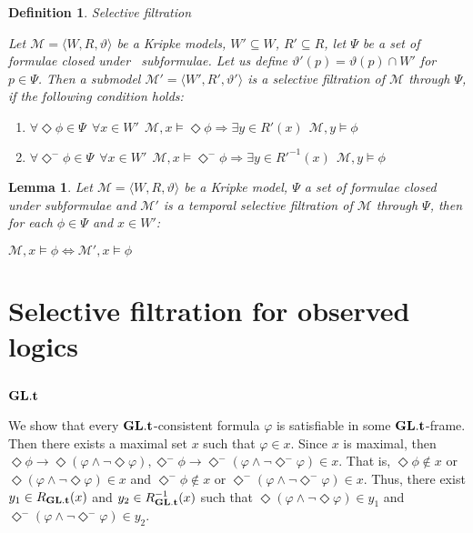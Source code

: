 \documentclass[a4paper]{article}
\theoremstyle{defin}
\newtheorem{defin}{Definition}
\theoremstyle{theorem}
\theoremstyle{prop}
\theoremstyle{lemma}
\newtheorem{lemma}{Lemma}
\theoremstyle{ex}
\theoremstyle{col}
\newcommand{\DiamondM}{\Diamond^{-}}
\begin{document}
\begin{defin} Selective filtration

  Let $\mathcal{M} = \langle W, R, \vartheta \rangle$ be a Kripke models, $W' \subseteq W$, $R' \subseteq R$, let $\Psi$ be a set of formulae closed under \
  subformulae. Let us define $\vartheta'(p) = \vartheta(p) \cap W'$ for $p \in \Psi$. Then a submodel $\mathcal{M}' = \langle W', R', \vartheta' \rangle$ is a
  selective filtration of $\mathcal{M}$ through $\Psi$, if the following condition holds:

  \begin{enumerate}
    \item $\forall \Diamond \phi \in \Psi \:\: \forall x \in W' \:\: \mathcal{M}, x \models \Diamond \phi \Rightarrow \exists y \in R'(x) \:\: \mathcal{M}, y \models \phi$
    \item $\forall \DiamondM \phi \in \Psi \:\: \forall x \in W' \:\: \mathcal{M}, x \models \DiamondM \phi \Rightarrow \exists y \in R'^{-1}(x) \:\: \mathcal{M}, y \models \phi$
  \end{enumerate}
\end{defin}

\begin{lemma}
  Let $\mathcal{M} = \langle W, R, \vartheta \rangle$ be a Kripke model, $\Psi$ a set of formulae closed under subformulae and $\mathcal{M}'$ is a temporal selective filtration of $\mathcal{M}$ through $\Psi$, then for each $\phi \in \Psi$ and $x \in W'$:

  \begin{center}
    $\mathcal{M}, x \models \phi \Leftrightarrow \mathcal{M}', x \models \phi$
  \end{center}
\end{lemma}

\section{Selective filtration for observed logics}

\subsection{${\bf GL}.{\bf t}$}

We show that every ${\bf GL}.{\bf t}$-consistent formula $\varphi$ is satisfiable in some ${\bf GL}.{\bf t}$-frame. Then there exists a maximal set $x$ such that $\varphi \in x$.
Since $x$ is maximal, then $\Diamond \phi \to \Diamond (\varphi \land \neg \Diamond \varphi), \DiamondM \phi \to \DiamondM (\varphi \land \neg \DiamondM \varphi) \in x$. That is, $\Diamond \phi \notin x$ or $\Diamond (\varphi \land \neg \Diamond \varphi) \in x$
and $\DiamondM \phi \notin x$ or $\DiamondM (\varphi \land \neg \DiamondM \varphi) \in x$. Thus, there exist $y_1 \in R_{{\bf GL}.{\bf t}}(x)$ and $y_2 \in R^{-1}_{{\bf GL}.{\bf t}}(x)$ such that $\Diamond (\varphi \land \neg \Diamond \varphi) \in y_1$ and $\DiamondM (\varphi \land \neg \DiamondM \varphi) \in y_2$.
\end{document}
